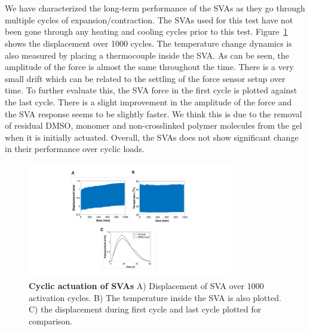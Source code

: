 \section{}
We have characterized the long-term performance of the SVAs as they go through multiple cycles of expansion/contraction. The SVAs used for this test have not been gone through any heating and cooling cycles prior to this test. Figure~\ref{fig:cyclicDisp} shows the displacement over 1000 cycles. The temperature change dynamics is also measured by placing a thermocouple inside the SVA. As can be seen, the amplitude of the force is almost the same throughout the time. There is a very small drift which can be related to the settling of the force sensor setup over time. To further evaluate this, the SVA force in the first cycle is plotted against the last cycle. There is a slight improvement in the amplitude of the force and the SVA response seems to be slightly faster. We think this is due to the removal of residual DMSO, monomer and non-crosslinked polymer molecules from the gel when it is initially actuated. Overall, the SVAs does not show significant change in their performance over cyclic loads. 
\begin{figure}[!htb]
      \centering
      \includegraphics[width=0.8\textwidth]{cyclicDisp.pdf}
      \caption[]{\textbf{Cyclic actuation of SVAs} A) Displacement of SVA over 1000 activation cycles. B) The temperature inside the SVA is also plotted. C) the displacement during first cycle and last cycle plotted for comparison.}
      \label{fig:cyclicDisp}
\end{figure}

